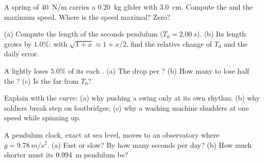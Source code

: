\begin{exercise}[$\star\star$]\label{exo:g12:oscillators-and-time:8}
A spring of  \qty{40}{N/m} carries a \qty{0.20}{kg} glider
with  \qty{3.0}{cm}. Compute the  and the
maximum speed. Where is the speed maximal? Zero?
\end{exercise}

\begin{exercise}[$\star\star$]\label{exo:g12:oscillators-and-time:9}
(a) Compute the length of the seconds pendulum ($T_0 =
\qty{2.00}{s}$). (b) Its length grows by $1.0\%$: with $\sqrt{1+x}
\approx 1 + x/2$, find the relative change of $T_0$ and the daily error.
\end{exercise}

\begin{exercise}[$\star\star$]\label{exo:g12:oscillators-and-time:10}
A lightly   loses $5.0\%$ of its  each .
(a) The  drop per ? (b) How many  to lose half
the ? (c) Is the  far from $T_0$?
\end{exercise}

\begin{exercise}[$\star\star$]\label{exo:g12:oscillators-and-time:11}
Explain with the  curve: (a) why pushing a swing  only
at its own rhythm; (b) why soldiers break step on footbridges; (c)
why a washing machine shudders at one speed while spinning up.
\end{exercise}

\begin{exercise}[$\star\star\star$]\label{exo:g12:oscillators-and-time:12}
A pendulum clock, exact at sea level, moves to an observatory where
$g = \qty{9.78}{m/s^2}$. (a) Fast or slow? By how many seconds per
day? (b) How much shorter must its \qty{0.994}{m} pendulum be?
\end{exercise}

